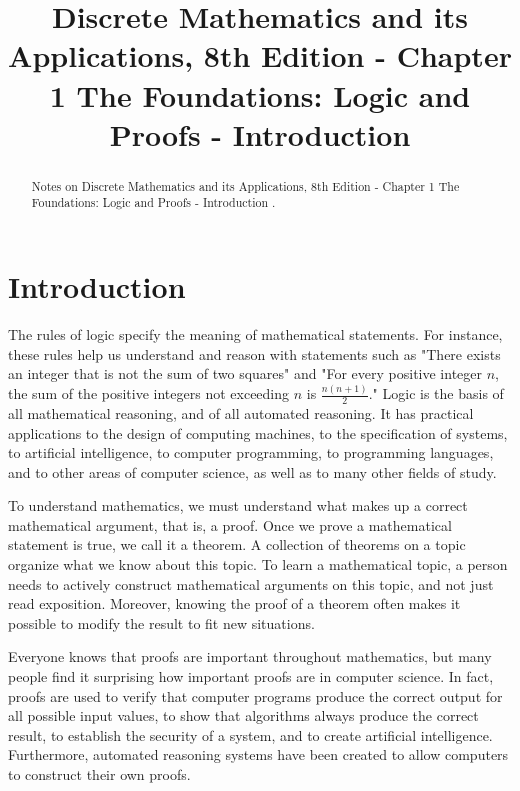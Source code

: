 \documentclass{Axon}
\title{Discrete Mathematics and its Applications, 8th Edition - Chapter 1 The Foundations: Logic and Proofs - Introduction}
\begin{document}
\maketitle
\makeauthor
\begin{abstract}
Notes on Discrete Mathematics and its Applications, 8th Edition - Chapter 1 The Foundations: Logic and Proofs - Introduction \cite{Rosen}.
\end{abstract}
\section{Introduction}
The rules of logic specify the meaning of mathematical statements. For instance, these rules help us understand and reason with statements such as "There exists an integer that is not the sum of two squares" and "For every positive integer \(n\), the sum of the positive integers not exceeding \(n\) is \(\frac{n(n+1)}{2}\)." Logic is the basis of all mathematical reasoning, and of all automated reasoning. It has practical applications to the design of computing machines, to the specification of systems, to artificial intelligence, to computer programming, to programming languages, and to other areas of computer science, as well as to many other fields of study.

To understand mathematics, we must understand what makes up a correct mathematical argument, that is, a proof. Once we prove a mathematical statement is true, we call it a theorem. A collection of theorems on a topic organize what we know about this topic. To learn a mathematical topic, a person needs to actively construct mathematical arguments on this topic, and not just read exposition. Moreover, knowing the proof of a theorem often makes it possible to modify the result to fit new situations.

Everyone knows that proofs are important throughout mathematics, but many people find it surprising how important proofs are in computer science. In fact, proofs are used to verify that computer programs produce the correct output for all possible input values, to show that algorithms always produce the correct result, to establish the security of a system, and to create artificial intelligence. Furthermore, automated reasoning systems have been created to allow computers to construct their own proofs.
\end{document}
